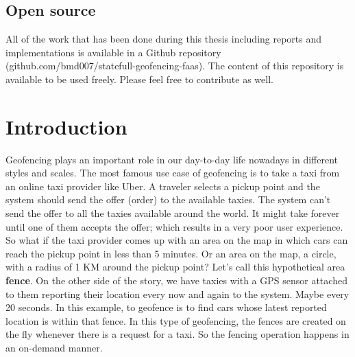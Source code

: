 \documentclass[a4]{report}
\begin{document}
    \section*{Open source}
    All of the work that has been done during this thesis including reports and implementations is available in a Github repository (github.com/bmd007/statefull-geofencing-faas).
    The content of this repository is available to be used freely.
    Please feel free to contribute as well.

    \newpage

    \tableofcontents

    \listoffigures

    \listoftables

    \newpage


    \chapter{Introduction}
    Geofencing\cite{geofencing} plays an important role in our day-to-day life nowadays in different styles and scales.
    The most famous use case of geofencing is to take a taxi\cite{taxi-geofencing} from an online taxi provider like Uber.
    A traveler selects a pickup point and the system should send the offer (order) to the available taxies.
    The system can't send the offer to all the taxies available around the world.
    It might take forever until one of them accepts the offer;
    which results in a very poor user experience.
    So what if the taxi provider comes up with an area on the map in which cars can reach the pickup point in less than 5 minutes.
    Or an area on the map, a circle, with a radius of 1 KM around the pickup point?
    Let's call this hypothetical area \textbf{fence}.
    On the other side of the story, we have taxies with a GPS sensor attached to them reporting their location every now and again to the system.
    Maybe every 20 seconds.
    In this example, to geofence is to find cars whose latest reported location is within that fence.
    In this type of geofencing, the fences are created on the fly whenever there is a request for a taxi.
    So the fencing operation happens in an on-demand manner.
\end{document}
